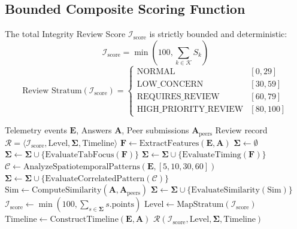 \documentclass[journal]{IEEEtran}
\begin{document}
\subsection{Bounded Composite Scoring Function}
The total Integrity Review Score $\mathcal{I}_{\text{score}}$ is strictly bounded and deterministic:
\begin{equation}
\mathcal{I}_{\text{score}} = \min \left(100, \sum_{k \in \mathcal{K}} S_k \right)
\end{equation}
\begin{equation}
\text{Review Stratum}(\mathcal{I}_{\text{score}}) = \begin{cases}
\text{NORMAL} & [0, 29] \\
\text{LOW\_CONCERN} & [30, 59] \\
\text{REQUIRES\_REVIEW} & [60, 79] \\
\text{HIGH\_PRIORITY\_REVIEW} & [80, 100]
\end{cases}
\end{equation}

\begin{algorithm}[t]
\caption{Deterministic Multi-Signal Integrity Evaluation}
\label{alg:integrity}
\begin{algorithmic}[1]
\REQUIRE Telemetry events $\mathbf{E}$, Answers $\mathbf{A}$, Peer submissions $\mathbf{A}_{\text{peers}}$
\ENSURE Review record $\mathcal{R} = \langle \mathcal{I}_{\text{score}}, \text{Level}, \mathbf{\Sigma}, \text{Timeline} \rangle$
\STATE $\mathbf{F} \leftarrow \text{ExtractFeatures}(\mathbf{E}, \mathbf{A})$
\STATE $\mathbf{\Sigma} \leftarrow \emptyset$
    \STATE $\mathbf{\Sigma} \leftarrow \mathbf{\Sigma} \cup \{\text{EvaluateTabFocus}(\mathbf{F})\}$
\ENDIF
{}
    \STATE $\mathbf{\Sigma} \leftarrow \mathbf{\Sigma} \cup \{\text{EvaluateTiming}(\mathbf{F})\}$
\ENDIF
\STATE $\mathcal{C} \leftarrow \text{AnalyzeSpatiotemporalPatterns}(\mathbf{E}, [5, 10, 30, 60])$
    \STATE $\mathbf{\Sigma} \leftarrow \mathbf{\Sigma} \cup \{\text{EvaluateCorrelatedPattern}(\mathcal{C})\}$
\ENDIF
\STATE $\text{Sim} \leftarrow \text{ComputeSimilarity}(\mathbf{A}, \mathbf{A}_{\text{peers}})$
    \STATE $\mathbf{\Sigma} \leftarrow \mathbf{\Sigma} \cup \{\text{EvaluateSimilarity}(\text{Sim})\}$
\ENDIF
\STATE $\mathcal{I}_{\text{score}} \leftarrow \min(100, \sum_{s \in \mathbf{\Sigma}} s.\text{points})$
\STATE $\text{Level} \leftarrow \text{MapStratum}(\mathcal{I}_{\text{score}})$
\STATE $\text{Timeline} \leftarrow \text{ConstructTimeline}(\mathbf{E}, \mathbf{A})$
\RETURN $\mathcal{R}(\mathcal{I}_{\text{score}}, \text{Level}, \mathbf{\Sigma}, \text{Timeline})$
\end{algorithmic}
\end{algorithm}
\end{document}
